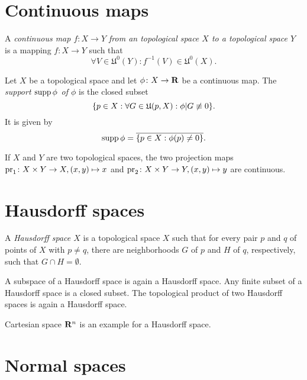 \section{Continuous maps}
\label{sec:continuity}

\begin{dfn}
  A \emph{continuous map $f\colon X \to Y$ from an topological space $X$ to
  a topological space $Y$} is a mapping $f\colon X \to Y$ such that
  \[
    \forall V \in \mathfrak U^0(Y) : f^{-1}(V) \in \mathfrak U^0(X).
  \]
\end{dfn}

Let $X$ be a topological space and let $\phi\colon X \to \mathbf{R}$ be a continuous map.
The \emph{support $\operatorname{supp} \phi$ of $\phi$} is the closed subset
\[
  \lbrace p \in X : \forall G \in \mathfrak U(p, X): \phi|G \not\equiv 0\rbrace.
\]
It is given by
\begin{equation}
  \label{eq:support}
  \operatorname{supp} \phi = \overline{\lbrace p \in X : \phi(p) \neq 0\rbrace}.
\end{equation}

If $X$ and $Y$ are two topological spaces, the two projection maps
$\mathrm{pr}_1\colon X \times Y \to X, (x, y) \mapsto x$ and
$\mathrm{pr}_2\colon X \times Y \to Y, (x, y) \mapsto y$ are continuous.

\section{Hausdorff spaces}
\label{sec:hausdorff_spaces}

\begin{dfn}
  A \emph{Hausdorff space $X$} is a topological space $X$ such that for every
  pair $p$ and $q$ of points of $X$ with $p \neq q$, there are neighborhoods $G$
  of $p$ and $H$ of $q$, respectively, such that $G \cap H = \emptyset$.
\end{dfn}
A subspace of a Hausdorff space is again a Hausdorff space. Any finite subset of
a Hausdorff space is a closed subset. The topological product of two Hausdorff
spaces is again a Hausdorff space.

Cartesian space $\mathbf{R}^n$ is an example for a Hausdorff space.


\section{Normal spaces}

